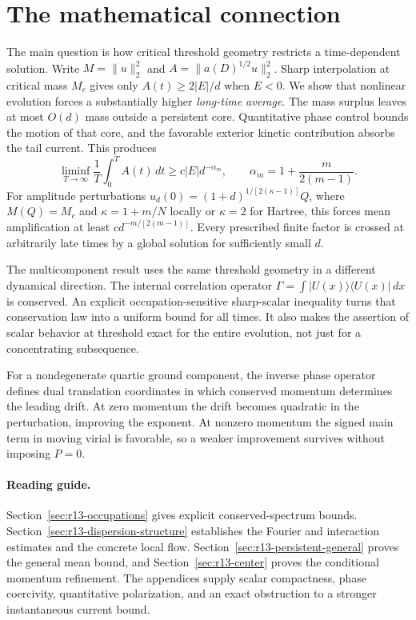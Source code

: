 \documentclass[11pt,a4paper]{article}
\theoremstyle{remark}\newtheorem{remark}[theorem]{Remark}
\begin{document}
\section*{The mathematical connection}
The main question is how critical threshold geometry restricts a
time-dependent solution. Write $M=\|u\|_2^2$ and
$A=\|a(D)^{1/2}u\|_2^2$. Sharp interpolation at critical mass $M_c$
gives only $A(t)\ge2|E|/d$ when $E<0$. We show that nonlinear evolution
forces a substantially higher \emph{long-time average}. The mass surplus
leaves at most $O(d)$ mass outside a persistent core. Quantitative phase
control bounds the motion of that core, and the favorable exterior
kinetic contribution absorbs the tail current. This produces
\[
 \liminf_{T\to\infty}\frac1T\int_0^T A(t)\,dt
 \ge c|E|d^{-\alpha_m},\qquad
 \alpha_m=1+\frac{m}{2(m-1)}.
\]
For amplitude perturbations $u_d(0)=(1+d)^{1/[2(\kappa-1)]}Q$,
where $M(Q)=M_c$ and $\kappa=1+m/N$ locally or $\kappa=2$ for
Hartree, this forces mean amplification at least
$cd^{-m/[2(m-1)]}$. Every prescribed finite factor is crossed at
arbitrarily late times by a global solution for sufficiently small $d$.

The multicomponent result uses the same threshold geometry in a
different dynamical direction. The internal correlation operator
$\Gamma=\int|U(x)\rangle\langle U(x)|\,dx$ is conserved.
An explicit occupation-sensitive sharp-scalar inequality turns that
conservation law into a uniform bound for all times. It also makes
the assertion of scalar behavior at threshold exact for the entire
evolution, not just for a concentrating subsequence.

For a nondegenerate quartic ground component, the inverse phase
operator defines dual translation coordinates in which conserved
momentum determines the leading drift. At zero momentum the drift
becomes quadratic in the perturbation, improving the exponent. At
nonzero momentum the signed main term in moving virial is favorable,
so a weaker improvement survives without imposing $P=0$.

\paragraph{Reading guide.}
Section~\ref{sec:r13-occupations} gives explicit conserved-spectrum
bounds. Section~\ref{sec:r13-dispersion-structure} establishes the
Fourier and interaction estimates and the concrete local flow.
Section~\ref{sec:r13-persistent-general} proves the general mean
bound, and Section~\ref{sec:r13-center} proves the conditional
momentum refinement. The appendices supply scalar compactness,
phase coercivity, quantitative polarization, and an exact obstruction
to a stronger instantaneous current bound.
\end{document}
